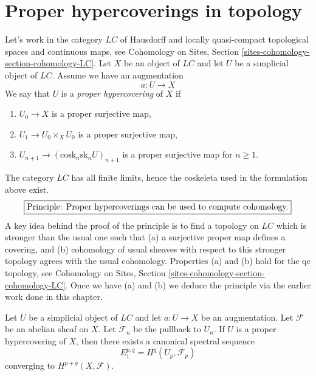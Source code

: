 \section{Proper hypercoverings in topology}
\label{section-proper-hypercovering}

\noindent
Let's work in the category $\textit{LC}$ of Hausdorff and locally
quasi-compact topological spaces and continuous maps, see
Cohomology on Sites, Section \ref{sites-cohomology-section-cohomology-LC}.
Let $X$ be an object of $\textit{LC}$ and let $U$ be a simplicial
object of $\textit{LC}$. Assume we have an augmentation
$$
a : U \to X
$$
We say that $U$ is a {\it proper hypercovering} of $X$ if
\begin{enumerate}
\item $U_0 \to X$ is a proper surjective map,
\item $U_1 \to U_0 \times_X U_0$ is a proper surjective map,
\item $U_{n + 1} \to (\text{cosk}_n\text{sk}_n U)_{n + 1}$
is a proper surjective map for $n \geq 1$.
\end{enumerate}
The category $\textit{LC}$ has all finite limits, hence the
coskeleta used in the formulation above exist.
$$
\fbox{Principle: Proper hypercoverings can be used to compute cohomology.}
$$
A key idea behind the proof of the principle is to find a topology
on $\textit{LC}$ which is stronger than the usual one such that
(a) a surjective proper map defines a covering, and
(b) cohomology of usual sheaves with respect to this stronger
topology agrees with the usual cohomology.
Properties (a) and (b) hold for the qc topology, see
Cohomology on Sites, Section \ref{sites-cohomology-section-cohomology-LC}.
Once we have (a) and (b) we deduce the principle via
the earlier work done in this chapter.

\begin{lemma}
\label{lemma-spectral-sequence-proper-hypercovering}
Let $U$ be a simplicial object of $\textit{LC}$ and let
$a : U \to X$ be an augmentation. Let $\mathcal{F}$ be an abelian sheaf
on $X$. Let $\mathcal{F}_n$ be the pullback to $U_n$.
If $U$ is a proper hypercovering of $X$, then
there exists a canonical spectral sequence
$$
E_1^{p, q} = H^q(U_p, \mathcal{F}_p)
$$
converging to $H^{p + q}(X, \mathcal{F})$.
\end{lemma}

